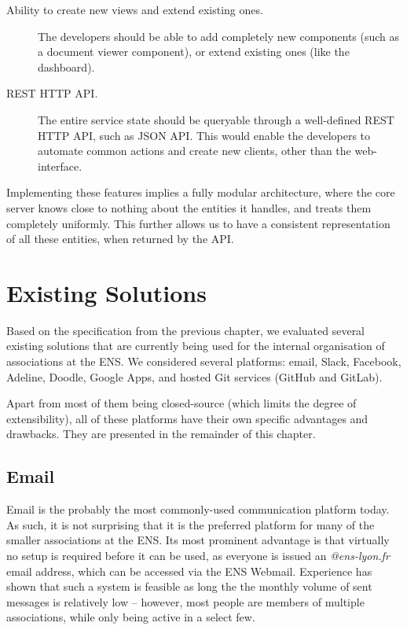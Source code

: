 \documentclass[a4paper, english]{report}
\begin{document}
\begin{description}
	\item[Ability to create new views and extend existing ones.] The developers should be able to add completely new components (such as a document viewer component), or extend existing ones (like the dashboard).
    \item[REST HTTP API.] The entire service state should be queryable through a well-defined REST HTTP API, such as JSON API. This would enable the developers to automate common actions and create new clients, other than the web-interface.
\end{description}

Implementing these features implies a fully modular architecture, where the core server knows close to nothing about the entities it handles, and treats them completely uniformly. This further allows us to have a consistent representation of all these entities, when returned by the API.

\chapter{Existing Solutions}
\label{chap:Existing Solutions}
Based on the specification from the previous chapter, we evaluated several existing solutions that are currently being used for the internal organisation of associations at the ENS. We considered several platforms: email, Slack, Facebook, Adeline, Doodle, Google Apps, and hosted Git services (GitHub and GitLab).

Apart from most of them being closed-source (which limits the degree of extensibility), all of these platforms have their own specific advantages and drawbacks. They are presented in the remainder of this chapter.
\section{Email}
Email is the probably the most commonly-used communication platform today. %
As such, it is not surprising that it is the preferred platform for many of the smaller associations at the ENS. Its most prominent advantage is that virtually no setup is required before it can be used, as everyone is issued an \emph{@ens-lyon.fr} email address, which can be accessed via the ENS Webmail. Experience has shown that such a system is feasible as long the the monthly volume of sent messages is relatively low -- however, most people are members of multiple associations, while only being active in a select few.
\end{document}
